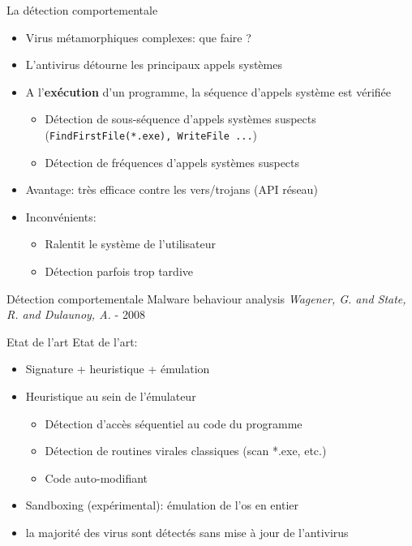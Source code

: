 \documentclass{beamer}
\begin{document}
\begin{frame}{La détection comportementale}
\begin{itemize}
\item Virus métamorphiques complexes: que faire ?
\item L'antivirus détourne les principaux appels systèmes
\item A l'\textbf{exécution} d'un programme, la séquence d'appels système est vérifiée
\begin{itemize}
\item Détection de sous-séquence d'appels systèmes suspects (\texttt{FindFirstFile(*.exe), WriteFile ...})
\item Détection de fréquences d'appels systèmes suspects
\end{itemize}
\item Avantage: très efficace contre les vers/trojans (API réseau)
\item Inconvénients:
\begin{itemize}
\item Ralentit le système de l'utilisateur
\item Détection parfois trop tardive
\end{itemize}
\end{itemize}
\begin{exampleblock}{Détection comportementale}
Malware behaviour analysis \textit{Wagener, G. and State, R. and Dulaunoy, A.} - 2008
\end{exampleblock}
\end{frame}


\begin{frame}{Etat de l'art}
Etat de l'art:
\begin{itemize}
\item Signature + heuristique + émulation
\item Heuristique au sein de l'émulateur
\begin{itemize}
\item Détection d'accès séquentiel au code du programme
\item Détection de routines virales classiques (scan *.exe, etc.)
\item Code auto-modifiant
\end{itemize}
\item Sandboxing (expérimental): émulation de l'os en entier
\item la majorité des virus sont détectés sans mise à jour de l'antivirus
\end{itemize}
\end{frame}
\end{document}
